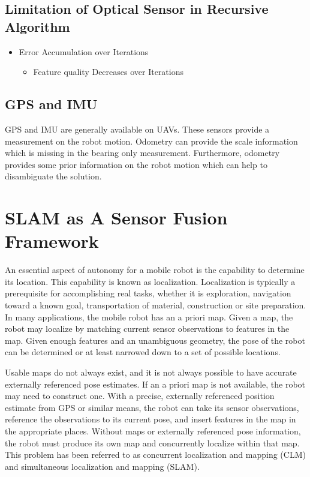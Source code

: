 \subsection{Limitation of Optical Sensor in Recursive Algorithm}
\label{sec:OpticalSensorLimitation}

\begin{itemize}
  \item Error Accumulation over Iterations
  \begin{itemize}
    \item Feature quality Decreases over Iterations
  \end{itemize}
\end{itemize}

\subsection{GPS and IMU}\label{sec:gps_and_imu}
GPS and IMU are generally available on UAVs. These sensors provide a 
measurement on the robot motion. Odometry can provide the scale 
information which is missing in the bearing only measurement. 
Furthermore, odometry provides some prior information on the robot 
motion which can help to disambiguate the solution.

\section{SLAM as A Sensor Fusion Framework}
\label{sec:SLAM}
An essential aspect of autonomy for a mobile robot is the capability to 
determine its location. This capability is known as localization. 
Localization is typically a prerequisite for accomplishing real tasks, 
whether it is exploration, navigation toward a known goal, 
transportation of material, construction or site preparation. In many 
applications, the mobile robot has an a priori map. Given a map, the 
robot may localize by matching current sensor observations to features 
in the map. Given enough features and an unambiguous geometry, the pose 
of the robot can be determined or at least narrowed down to a set of 
possible locations.

Usable maps do not always exist, and it is not always possible to have 
accurate externally referenced pose estimates. If an a priori map is not 
available, the robot may need to construct one. With a precise, 
externally referenced position estimate from GPS or similar means, the 
robot can take its sensor observations, reference the observations to 
its current pose, and insert features in the map in the appropriate 
places. Without maps or externally referenced pose information, the 
robot must produce its own map and concurrently localize within that 
map. This problem has been referred to as concurrent localization and 
mapping (CLM) and simultaneous localization and mapping (SLAM).

